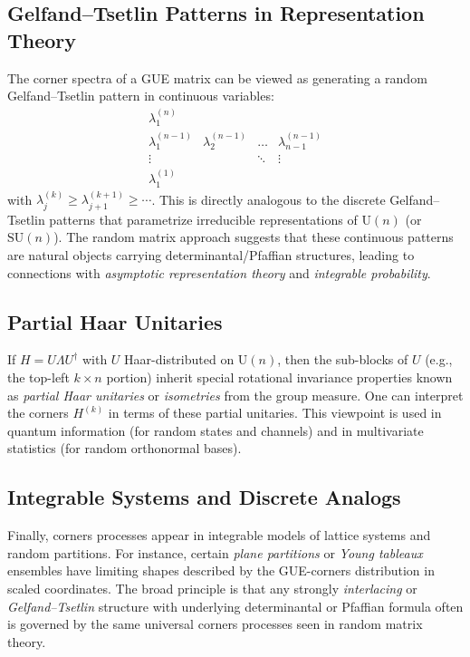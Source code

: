 \documentclass[letterpaper,11pt,oneside,reqno]{article}
\numberwithin{equation}{section}
\theoremstyle{definition}
\begin{document}
\subsection{Gelfand--Tsetlin Patterns in Representation Theory}
The corner spectra of a GUE matrix can be viewed as generating a random Gelfand--Tsetlin pattern in continuous variables:
\[
	\begin{matrix}
	\lambda_1^{(n)} \\
	\lambda_1^{(n-1)} & \lambda_2^{(n-1)} & \dots & \lambda_{n-1}^{(n-1)} \\
	\vdots & & \ddots & \vdots \\
	\lambda_1^{(1)} 
	\end{matrix}
\]
with $\lambda_{j}^{(k)}\ge \lambda_{j+1}^{(k+1)}\ge \cdots$. This is directly analogous to the discrete Gelfand--Tsetlin patterns that parametrize irreducible representations of $\mathrm{U}(n)$ (or $\mathrm{SU}(n)$). The random matrix approach suggests that these continuous patterns are natural objects carrying determinantal/Pfaffian structures, leading to connections with \emph{asymptotic representation theory} and \emph{integrable probability}.

\subsection{Partial Haar Unitaries}
If $H=U\Lambda U^\dagger$ with $U$ Haar-distributed on $\mathrm{U}(n)$, then the sub-blocks of $U$ (e.g., the top-left $k\times n$ portion) inherit special rotational invariance properties known as \emph{partial Haar unitaries} or \emph{isometries} from the group measure. One can interpret the corners $H^{(k)}$ in terms of these partial unitaries. This viewpoint is used in quantum information (for random states and channels) and in multivariate statistics (for random orthonormal bases).

\subsection{Integrable Systems and Discrete Analogs}
Finally, corners processes appear in integrable models of lattice systems and random partitions. For instance, certain \emph{plane partitions} or \emph{Young tableaux} ensembles have limiting shapes described by the GUE-corners distribution in scaled coordinates. The broad principle is that any strongly \emph{interlacing} or \emph{Gelfand--Tsetlin} structure with underlying determinantal or Pfaffian formula often is governed by the same universal corners processes seen in random matrix theory.
\end{document}
